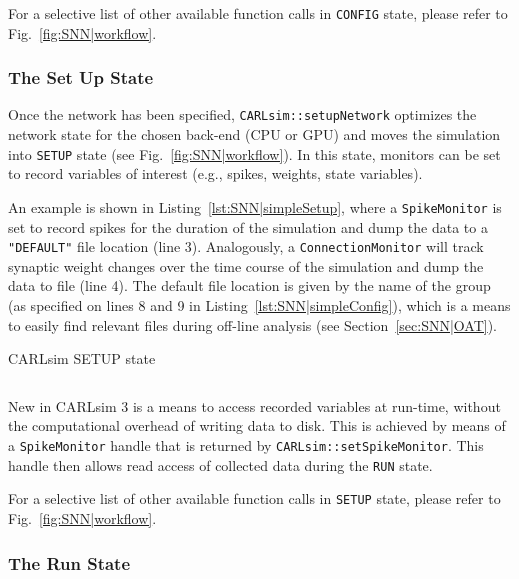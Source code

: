 For a selective list of other available function calls in \texttt{CONFIG} 
state, please refer to Fig.~\ref{fig:SNN|workflow}.


\subsubsection{The Set Up State}
\label{sec:SNN|API|SETUP}

Once the network has been specified, \texttt{CARLsim::setupNetwork}
optimizes the network state for the chosen back-end (\ac{CPU} or \ac{GPU})
and moves the simulation into \texttt{SETUP} state (see 
Fig.~\ref{fig:SNN|workflow}).
In this state, monitors can be set to record variables of interest
(e.g., spikes, weights, state variables).

An example is shown in Listing~\ref{lst:SNN|simpleSetup},
where a \texttt{SpikeMonitor} is set to record spikes for the duration
of the simulation and dump the data to a \texttt{"DEFAULT"} file
location (line 3).
Analogously, a \texttt{ConnectionMonitor} will track synaptic weight
changes over the time course of the simulation and dump the data to
file (line 4).
The default file location is given by the name of the group
(as specified on lines 8 and 9 in Listing~\ref{lst:SNN|simpleConfig}),
which is a means to easily find relevant files during off-line
analysis (see Section~\ref{sec:SNN|OAT}).

\begin{listing}[h]
\caption{CARLsim SETUP state}
\vspace{-0.7cm}
\inputminted{c++}{listings/snn_simple_setup.cpp}
\label{lst:SNN|simpleSetup}
\end{listing}

New in CARLsim 3 is a means to access recorded variables at run-time,
without the computational overhead of writing data to disk.
This is achieved by means of a \texttt{SpikeMonitor} handle that is
returned by \texttt{CARLsim::setSpikeMonitor}.
This handle then allows read access of collected data during the
\texttt{RUN} state.

For a selective list of other available function calls in \texttt{SETUP} 
state, please refer to Fig.~\ref{fig:SNN|workflow}.



\subsubsection{The Run State}
\label{sec:SNN|API|RUN}

